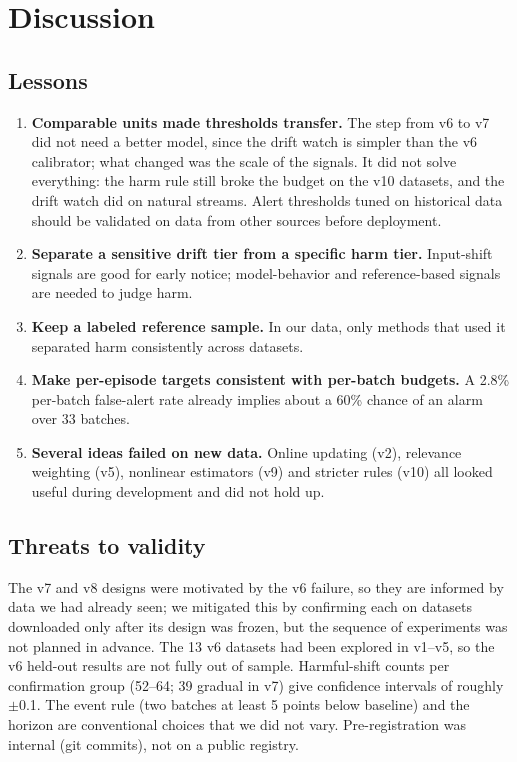 \section{Discussion}
\subsection{Lessons}
\begin{enumerate}
\item \textbf{Comparable units made thresholds transfer.} The step from v6 to v7 did not need a better model, since the drift watch is simpler than the v6 calibrator; what changed was the scale of the signals. It did not solve everything: the harm rule still broke the budget on the v10 datasets, and the drift watch did on natural streams. Alert thresholds tuned on historical data should be validated on data from other sources before deployment.
\item \textbf{Separate a sensitive drift tier from a specific harm tier.} Input-shift signals are good for early notice; model-behavior and reference-based signals are needed to judge harm.
\item \textbf{Keep a labeled reference sample.} In our data, only methods that used it separated harm consistently across datasets.
\item \textbf{Make per-episode targets consistent with per-batch budgets.} A 2.8\% per-batch false-alert rate already implies about a 60\% chance of an alarm over 33 batches.
\item \textbf{Several ideas failed on new data.} Online updating (v2), relevance weighting (v5), nonlinear estimators (v9) and stricter rules (v10) all looked useful during development and did not hold up.
\end{enumerate}

\subsection{Threats to validity}
The v7 and v8 designs were motivated by the v6 failure, so they are informed by data we had already seen; we mitigated this by confirming each on datasets downloaded only after its design was frozen, but the sequence of experiments was not planned in advance. The 13 v6 datasets had been explored in v1--v5, so the v6 held-out results are not fully out of sample. Harmful-shift counts per confirmation group (52--64; 39 gradual in v7) give confidence intervals of roughly $\pm$0.1. The event rule (two batches at least 5 points below baseline) and the horizon are conventional choices that we did not vary. Pre-registration was internal (git commits), not on a public registry.

